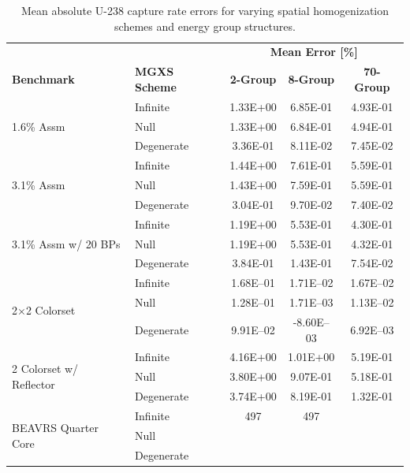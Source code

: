 \begin{table}[h!]
  \centering
  \caption[Mean OpenMOC U-238 capture rate errors]{Mean absolute U-238 capture rate errors for varying spatial homogenization schemes and energy group structures.}
  \small
  \label{table:chap8-openmoc-mean-capt-rates}
  \vspace{6pt}
  \begin{tabular}{l l c c c}
  \toprule
  \rowcolor{lightgray}
  & & \multicolumn{3}{c}{\cellcolor{lightgray} \textbf{Mean Error [\%]}} \\
  \multirow{-2}{*}{\cellcolor{lightgray} \bf Benchmark} &
  \multirow{-2}{*}{\cellcolor{lightgray} \bf \ac{MGXS} Scheme} &
  \multicolumn{1}{c}{{\cellcolor{lightgray} \bf 2-Group}} &
  \multicolumn{1}{c}{{\cellcolor{lightgray} \bf 8-Group}} &
  \multicolumn{1}{c}{{\cellcolor{lightgray} \bf 70-Group}} \\
  \midrule
\multirow{3}{*}{\parbox{2.5cm}{1.6\% Assm}} & Infinite & 1.33E+00 & 6.85E-01 & 4.93E-01 \\
& Null & 1.33E+00 & 6.84E-01 & 4.94E-01 \\
& Degenerate & 3.36E-01 & 8.11E-02 & 7.45E-02 \\
  \midrule
\multirow{3}{*}{\parbox{2.5cm}{3.1\% Assm}} & Infinite & 1.44E+00 & 7.61E-01 & 5.59E-01 \\
& Null & 1.43E+00 & 7.59E-01 & 5.59E-01 \\
& Degenerate & 3.04E-01 & 9.70E-02 & 7.40E-02 \\
  \midrule
\multirow{3}{*}{\parbox{2.5cm}{3.1\% Assm w/ 20 BPs}} & Infinite & 1.19E+00 & 5.53E-01 & 4.30E-01 \\
& Null & 1.19E+00 & 5.53E-01 & 4.32E-01 \\
& Degenerate & 3.84E-01 & 1.43E-01 & 7.54E-02 \\
  \midrule
\multirow{3}{*}{\parbox{2.5cm}{2$\times$2 Colorset}} & Infinite & 1.68E--01 & 1.71E--02 & 1.67E--02 \\
& Null & 1.28E--01 & 1.71E--03 & 1.13E--02 \\
& Degenerate & 9.91E--02 & -8.60E--03 & 6.92E--03 \\
  \midrule
\multirow{3}{*}{\parbox{2.5cm}{2 Colorset w/ Reflector}} & Infinite & 4.16E+00 & 1.01E+00 & 5.19E-01 \\
& Null & 3.80E+00 & 9.07E-01 & 5.18E-01 \\
& Degenerate & 3.74E+00 & 8.19E-01 & 1.32E-01 \\
  \midrule
  \multirow{3}{*}{\parbox{2cm}{\ac{BEAVRS} Quarter Core}} & Infinite & 497 & 497 & \\
  & Null & & & \\
  & Degenerate & & & \\
  \bottomrule
\end{tabular}
\end{table}


